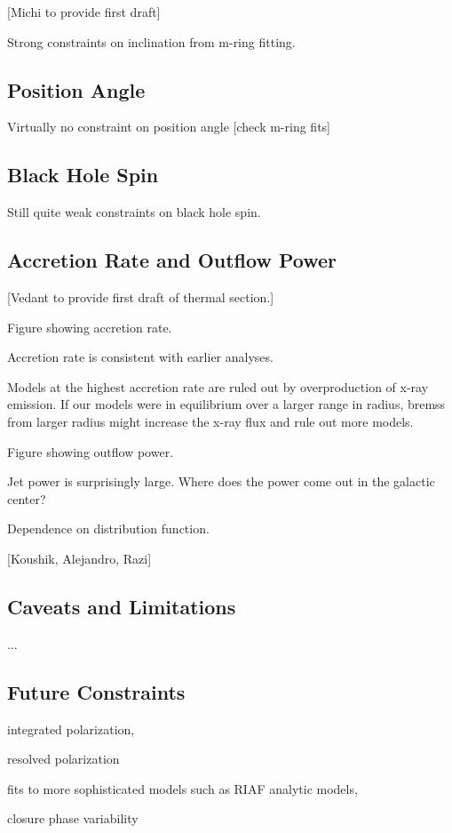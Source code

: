 [Michi to provide first draft]

Strong constraints on inclination from m-ring fitting.

\subsection{Position Angle}

Virtually no constraint on position angle [check m-ring fits]

\subsection{Black Hole Spin}

Still quite weak constraints on black hole spin.

\subsection{Accretion Rate and Outflow Power}

[Vedant to provide first draft of thermal section.]

Figure showing accretion rate.

Accretion rate is consistent with earlier analyses.

Models at the highest accretion rate are ruled out by overproduction of x-ray emission.  If our models were in equilibrium over a larger range in radius, bremss from larger radius might increase the x-ray flux and rule out more models.

Figure showing outflow power.

Jet power is surprisingly large.  Where does the power come out in the galactic center?

Dependence on distribution function.

[Koushik, Alejandro, Razi]

\subsection{Caveats and Limitations}

...

\subsection{Future Constraints}

integrated polarization,

resolved polarization

fits to more sophisticated models such as RIAF analytic models,

closure phase variability
